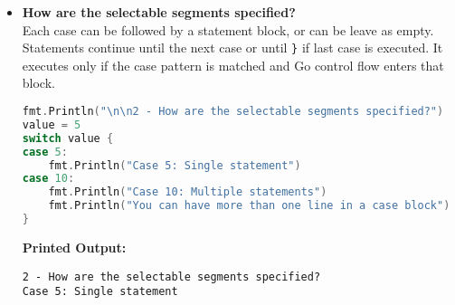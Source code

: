 \documentclass{article}
\begin{document}
\begin{itemize}
\begin{lstlisting}[language=Go]
for _, i = range items {
    // print value and type of i
    fmt.Printf("Value: %v, Type: %T\t\t", i, i)
    switch v := i.(type) {
    case int:
        fmt.Println("Control expression is an integer")
    case string:
        fmt.Println("Control expression is a string")
    case [2]int:
        fmt.Println("Control expression is an array length 2")
    case []int:
        fmt.Println("Control expression is a slice")
    case map[string]int:
        fmt.Println("Control expression is a map")
    case bool:
        fmt.Println("Control expression is a boolean")
    case nil:
        fmt.Println("Control expression is nil")
    case Obj:
        if v.x == 3 {
            fmt.Println("Control expression is an Obj with x = 3")
        } else {
            fmt.Println("Control expression is an Obj")
        }
    default:
        fmt.Println("No match found")
    }
}
\end{lstlisting}
\textbf{Printed Output:} \begin{verbatim}
1 - What is the form and type of the control expression?
Control expression is an integer
Control expression is an expression resulting in 7
Control expression is a literal
Object with x = 4
Value: 1, Type: int		Control expression is an integer
Value: apple, Type: string		Control expression is a string
Value: [3 4], Type: [2]int		Control expression is an array length 2
Value: [1 2 3], Type: []int		Control expression is a slice
Value: map[key:1], Type: map[string]int		Control expression is a map
Value: true, Type: bool		Control expression is a boolean
Value: <nil>, Type: <nil>		Control expression is nil
Value: {3}, Type: main.Obj		Control expression is an Obj with x = 3
\end{verbatim}

\item \textbf{How are the selectable segments specified?} \\
Each case can be followed by a statement block, or can be leave as empty. Statements continue until the next case or until \texttt{\}} if last case is executed. It executes only if the case pattern is matched and Go control flow enters that block.
\begin{lstlisting}[language=Go]
fmt.Println("\n\n2 - How are the selectable segments specified?")
value = 5
switch value {
case 5:
    fmt.Println("Case 5: Single statement")
case 10:
    fmt.Println("Case 10: Multiple statements")
    fmt.Println("You can have more than one line in a case block")
}
\end{lstlisting}
\textbf{Printed Output:} \begin{verbatim}
2 - How are the selectable segments specified?
Case 5: Single statement
\end{verbatim}


\end{itemize}
\end{document}
